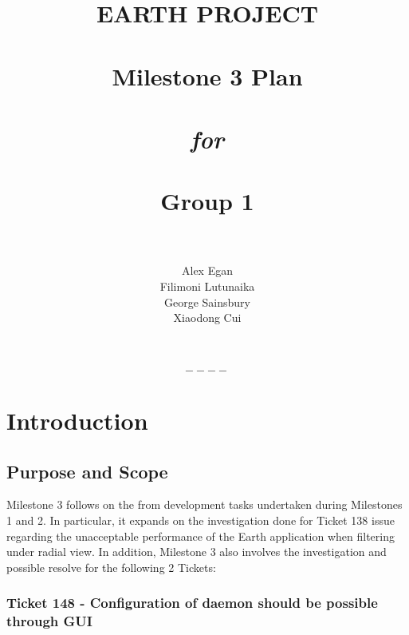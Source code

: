 \documentclass[10pt,a4,oneside]{article}
\begin{document}
\title{\textbf{EARTH PROJECT}\\ \textit{} \\ \textit{} \textbf{Milestone 3 Plan}\\ \textit{} \\ \textit{} \textit{for} \\ \textit{} \\ \textit{} \textbf{Group 1}\\ \textit{} \\ \textit{}}
\author{Alex Egan \\ Filimoni Lutunaika \\ George Sainsbury \\ Xiaodong Cui}
 
\maketitle

\newpage

\tableofcontents

\[----\]

\paragraph{}

\listoffigures
 
\newpage

\section{Introduction} 
 
\subsection{Purpose and Scope}

\label{subsec:purpose-and-scope}
 
Milestone 3 follows on the from development tasks undertaken during Milestones 1 and 2. In particular, 
it expands on the investigation done for Ticket 138 issue regarding the unacceptable performance of the 
Earth application when filtering under radial view. In addition, Milestone 3 also involves the investigation 
and possible resolve for the following 2 Tickets:

\subsubsection*{Ticket 148 - Configuration of daemon should be possible through GUI}
\end{document}

